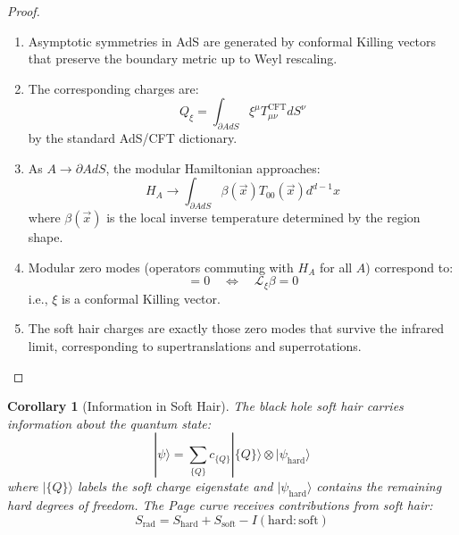 \documentclass[12pt,a4paper]{article}
\newtheorem{corollary}[theorem]{Corollary}
\begin{document}
\begin{proof}
\begin{enumerate}
    \item Asymptotic symmetries in AdS are generated by conformal Killing vectors that preserve the boundary metric up to Weyl rescaling.
    
    \item The corresponding charges are:
    \begin{equation}
    Q_\xi = \int_{\partial AdS} \xi^\mu T_{\mu\nu}^{\text{CFT}} dS^\nu
    \end{equation}
    by the standard AdS/CFT dictionary.
    
    \item As $A \to \partial AdS$, the modular Hamiltonian approaches:
    \begin{equation}
    H_A \to \int_{\partial AdS} \beta(\vec{x}) T_{00}(\vec{x}) d^{d-1}x
    \end{equation}
    where $\beta(\vec{x})$ is the local inverse temperature determined by the region shape.
    
    \item Modular zero modes (operators commuting with $H_A$ for all $A$) correspond to:
    \begin{equation}
    [Q_\xi, H_A] = 0 \quad \Leftrightarrow \quad \mathcal{L}_\xi \beta = 0
    \end{equation}
    i.e., $\xi$ is a conformal Killing vector.
    
    \item The soft hair charges are exactly those zero modes that survive the infrared limit, corresponding to supertranslations and superrotations.
\end{enumerate}
\end{proof}

\begin{corollary}[Information in Soft Hair]
The black hole soft hair carries information about the quantum state:
\begin{equation}
|\psi\rangle = \sum_{\{Q\}} c_{\{Q\}} |\{Q\}\rangle \otimes |\psi_{\text{hard}}\rangle
\end{equation}
where $|\{Q\}\rangle$ labels the soft charge eigenstate and $|\psi_{\text{hard}}\rangle$ contains the remaining hard degrees of freedom. The Page curve receives contributions from soft hair:
\begin{equation}
S_{\text{rad}} = S_{\text{hard}} + S_{\text{soft}} - I(\text{hard}:\text{soft})
\end{equation}
\end{corollary}
\end{document}
